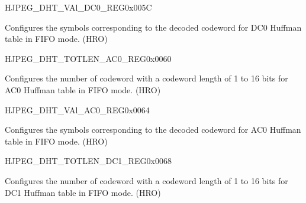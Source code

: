 \begin{register}{H}{JPEG\_DHT\_VAl\_DC0\_REG}{0x005C}\label{regdesc:JPEGDHTVALDC0REG}
%
\regnewline%
\begin{regdesc}\begin{reglist}
\label{fielddesc:JPEGDHTVALDC0}\item [JPEG\_DHT\_VAL\_DC0] Configures the symbols corresponding to the decoded codeword for DC0 Huffman table in FIFO mode. (HRO)
\end{reglist}\end{regdesc}
\end{register}


\begin{register}{H}{JPEG\_DHT\_TOTLEN\_AC0\_REG}{0x0060}\label{regdesc:JPEGDHTTOTLENAC0REG}
%
\regnewline%
\begin{regdesc}\begin{reglist}
\label{fielddesc:JPEGDHTTOTLENAC0}\item [JPEG\_DHT\_TOTLEN\_AC0] Configures the number of codeword with a codeword length of 1 to 16 bits for AC0 Huffman table in FIFO mode. (HRO)
\end{reglist}\end{regdesc}
\end{register}


\begin{register}{H}{JPEG\_DHT\_VAl\_AC0\_REG}{0x0064}\label{regdesc:JPEGDHTVALAC0REG}
%
\regnewline%
\begin{regdesc}\begin{reglist}
\label{fielddesc:JPEGDHTVALAC0}\item [JPEG\_DHT\_VAL\_AC0] Configures the symbols corresponding to the decoded codeword for AC0 Huffman table in FIFO mode. (HRO)
\end{reglist}\end{regdesc}
\end{register}


\begin{register}{H}{JPEG\_DHT\_TOTLEN\_DC1\_REG}{0x0068}\label{regdesc:JPEGDHTTOTLENDC1REG}
%
\regnewline%
\begin{regdesc}\begin{reglist}
\label{fielddesc:JPEGDHTTOTLENDC1}\item [JPEG\_DHT\_TOTLEN\_DC1] Configures the number of codeword with a codeword length of 1 to 16 bits for DC1 Huffman table in FIFO mode. (HRO)
\end{reglist}\end{regdesc}
\end{register}


